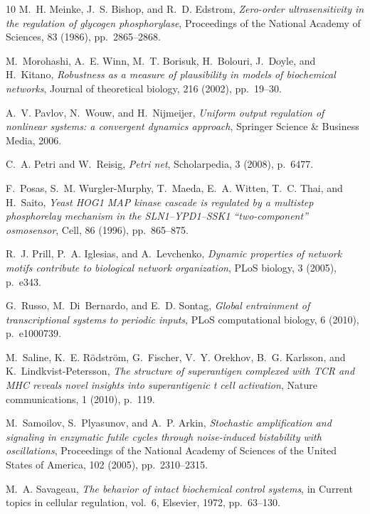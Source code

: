\documentclass[onefignum,onetabnum]{siamonline220329}
\begin{document}
{\begin{thebibliography}{10}
	{\sc M.~H. Meinke, J.~S. Bishop, and R.~D. Edstrom}, {\em Zero-order
		ultrasensitivity in the regulation of glycogen phosphorylase}, Proceedings of
	the National Academy of Sciences, 83 (1986), pp.~2865--2868.
	
	{\sc M.~Morohashi, A.~E. Winn, M.~T. Borisuk, H.~Bolouri, J.~Doyle, and
		H.~Kitano}, {\em Robustness as a measure of plausibility in models of
		biochemical networks}, Journal of theoretical biology, 216 (2002),
	pp.~19--30.
	
	{\sc A.~V. Pavlov, N.~Wouw, and H.~Nijmeijer}, {\em Uniform output regulation
		of nonlinear systems: a convergent dynamics approach}, Springer Science \&
	Business Media, 2006.
	
	{\sc C.~A. Petri and W.~Reisig}, {\em {P}etri net}, Scholarpedia, 3 (2008),
	p.~6477.
	
	{\sc F.~Posas, S.~M. Wurgler-Murphy, T.~Maeda, E.~A. Witten, T.~C. Thai, and
		H.~Saito}, {\em Yeast {HOG1 MAP} kinase cascade is regulated by a multistep
		phosphorelay mechanism in the {SLN1--YPD1--SSK1} “two-component”
		osmosensor}, Cell, 86 (1996), pp.~865--875.
	
	{\sc R.~J. Prill, P.~A. Iglesias, and A.~Levchenko}, {\em Dynamic properties of
		network motifs contribute to biological network organization}, PLoS biology,
	3 (2005), p.~e343.
	
	{\sc G.~Russo, M.~Di~Bernardo, and E.~D. Sontag}, {\em Global entrainment of
		transcriptional systems to periodic inputs}, PLoS computational biology, 6
	(2010), p.~e1000739.
	
	{\sc M.~Saline, K.~E. R{\"o}dstr{\"o}m, G.~Fischer, V.~Y. Orekhov, B.~G.
		Karlsson, and K.~Lindkvist-Petersson}, {\em The structure of superantigen
		complexed with {TCR} and {MHC} reveals novel insights into superantigenic t
		cell activation}, Nature communications, 1 (2010), p.~119.
	
	{\sc M.~Samoilov, S.~Plyasunov, and A.~P. Arkin}, {\em Stochastic amplification
		and signaling in enzymatic futile cycles through noise-induced bistability
		with oscillations}, {Proceedings of the National Academy of Sciences of the
		United States of America}, 102 (2005), pp.~2310--2315.
	
	{\sc M.~A. Savageau}, {\em The behavior of intact biochemical control systems},
	in Current topics in cellular regulation, vol.~6, Elsevier, 1972,
	pp.~63--130.
	

\end{thebibliography}}
\end{document}
